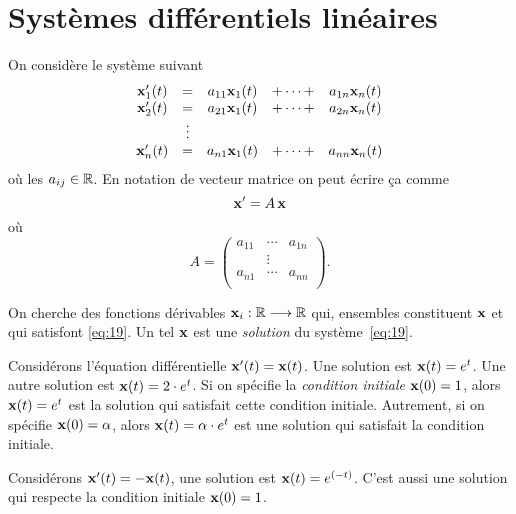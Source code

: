\chapter{Systèmes différentiels linéaires}
\label{cha:syst-diff-line}

On considère le système suivant
\begin{equation}
  \label{eq:19}
  \begin{array}{ccccc}
    \mathbf{x}'_1(t) & = &a_{11}\mathbf{x}_1(t) & + \cdots + & a_{1n}\mathbf{x}_n(t) \\
    \mathbf{x}'_2(t) & = &a_{21}\mathbf{x}_1(t) & + \cdots + & a_{2n}\mathbf{x}_n(t) \\
            & \vdots \\             
    \mathbf{x}'_n(t) & = &a_{n1}\mathbf{x}_1(t) & + \cdots + & a_{nn}\mathbf{x}_n(t)
  \end{array}
\end{equation}
où les $a_{ij} \in \mathbb{R}$.  
En notation de vecteur matrice on peut écrire ça comme 
\begin{displaymath}
  \mathbf{x}' = A\,\mathbf{x}
\end{displaymath}
où 
\begin{displaymath}
  A =
  \begin{pmatrix}
    a_{11} & \cdots & a_{1n}\\
          & \vdots & \\
          a_{n1} & \cdots & a_{nn}\\          
  \end{pmatrix}.
\end{displaymath}

On cherche des fonctions dérivables $\mathbf{x}_i: \mathbb{R} \longrightarrow \mathbb{R}$  qui, ensembles constituent $\mathbf{x}$ et qui  satisfont \eqref{eq:19}. Un tel $\mathbf{x}$ est une \emph{solution} du système~\eqref{eq:19}. 



\begin{example}
  \label{exe:20}
  Considérons l'équation différentielle $\mathbf{x}'(t) = \mathbf{x}(t)$. Une solution est $\mathbf{x}(t) = e^t$. Une autre solution est $\mathbf{x}(t) = 2\cdot e^t$. Si on spécifie la \emph{condition initiale} $\mathbf{x}(0) = 1$, alors $\mathbf{x}(t) = e^t$ est la solution qui satisfait cette condition initiale. Autrement, si on spécifie $\mathbf{x}(0) = \alpha$, alors  $\mathbf{x}(t) = \alpha \cdot e^t$ est une solution qui satisfait la condition initiale. 

Considérons $\mathbf{x}'(t) = -\mathbf{x}(t)$, une solution est $\mathbf{x}(t) = e^{(-t)}$. %
C'est aussi une solution qui respecte la condition initiale $\mathbf{x}(0) = 1$. 
\end{example}



